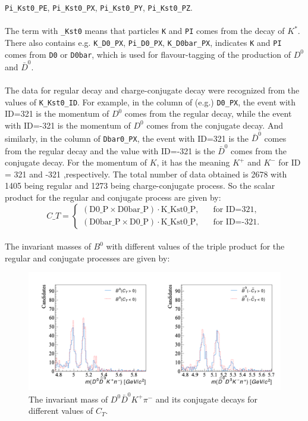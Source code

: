 \texttt{Pi\_Kst0\_PE}, \texttt{Pi\_Kst0\_PX}, \texttt{Pi\_Kst0\_PY}, \texttt{Pi\_Kst0\_PZ}. 
\\
\\
The term with \texttt{\_Kst0} means that particles \texttt{K} and \texttt{PI} comes from the decay of $K^*$. There also contains e.g. \texttt{K\_D0\_PX}, \texttt{Pi\_D0\_PX}, \texttt{K\_D0bar\_PX}, indicates \texttt{K} and \texttt{PI} comes from \texttt{D0} or \texttt{D0bar}, which is used for flavour-tagging of the production of $D^0$ and $\bar{D}^0$.
\\
\\
The data for regular decay and charge-conjugate decay were recognized from the values of \texttt{K\_Kst0\_ID}. For example, in the column of (e.g.) \texttt{D0\_PX}, the event with ID=321 is the momentum of $D^0$ comes from the regular decay, while the event with ID=-321 is the momentum of $D^0$ comes from the conjugate decay. And similarly, in the column of \texttt{Dbar0\_PX}, the event with ID=321 is the $\bar{D}^0$ comes from the regular decay and the value with ID=-321 is the $\bar{D}^0$ comes from the conjugate decay. For the momentum of $K$, it has the meaning $K^+$ and $K^-$ for ID = 321 and -321 ,respectively. The total number of data obtained is 2678 with 1405 being regular and 1273 being charge-conjugate process. So the scalar product for the regular and conjugate process are given by:
\begin{equation}
    C\_T =
\begin{cases}
    (\text{D0\_P} \times \text{D0bar\_P})\cdot \text{K\_Kst0\_P}, & \;\;\;\text{for ID=321}, \\
    (\text{D0bar\_P} \times \text{D0\_P})\cdot \text{K\_Kst0\_P}, & \;\;\;\text{for ID=-321}.
\end{cases}
\end{equation}
\\
The invariant masses of $B^0$ with different values of the triple product for the regular and conjugate processes are given by:
\begin{figure}[h]
\center
\includegraphics*[width=0.96\linewidth]{LHCb_runI/invmass_B0_noweight}
\caption{The invariant mass of $D^0\bar{D}^0K^+\pi^-$ and its conjugate decays for different values of $C_T$.}
\label{inv_B0_runi_noweight}
\end{figure}
